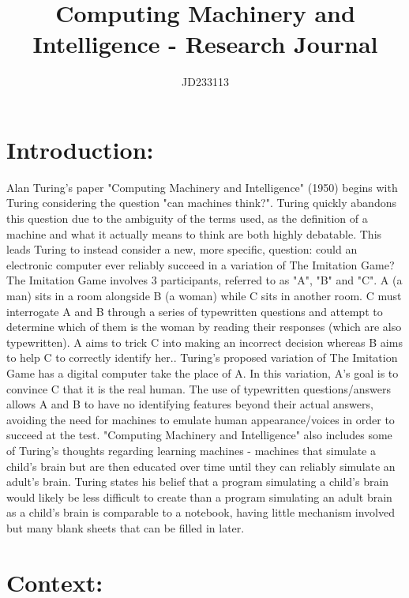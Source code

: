 \documentclass{article}
\title{Computing Machinery and Intelligence - Research Journal}
\author{JD233113}
\begin{document}
\maketitle

\section{Introduction:}

Alan Turing's paper "Computing Machinery and Intelligence" (1950) begins with Turing considering the question "can machines think?". Turing quickly abandons this question due to the ambiguity of the terms used, as the definition of a machine and what it actually means to think are both highly debatable. This leads Turing to instead consider a new, more specific, question: could an electronic computer ever reliably succeed in a variation of The Imitation Game?
\break
\break
The Imitation Game involves 3 participants, referred to as "A", "B" and "C". A (a man) sits in a room alongside B (a woman) while C sits in another room. C must interrogate A and B through a series of typewritten questions and attempt to determine which of them is the woman by reading their responses (which are also typewritten). A aims to trick C into making an incorrect decision whereas B aims to help C to correctly identify her.\cite{turing1950_intelligence}. Turing's proposed variation of The Imitation Game has a digital computer take the place of A. In this variation, A's goal is to convince C that it is the real human. The use of typewritten questions/answers allows A and B to have no identifying features beyond their actual answers, avoiding the need for machines to emulate human appearance/voices in order to succeed at the test.
\break
\break
"Computing Machinery and Intelligence" also includes some of Turing's thoughts regarding learning machines - machines that simulate a child's brain but are then educated over time until they can reliably simulate an adult's brain. Turing states his belief that a program simulating a child's brain would likely be less difficult to create than a program simulating an adult brain as a child's brain is comparable to a notebook, having little mechanism involved but many blank sheets that can be filled in later.

\section{Context:}
\end{document}
